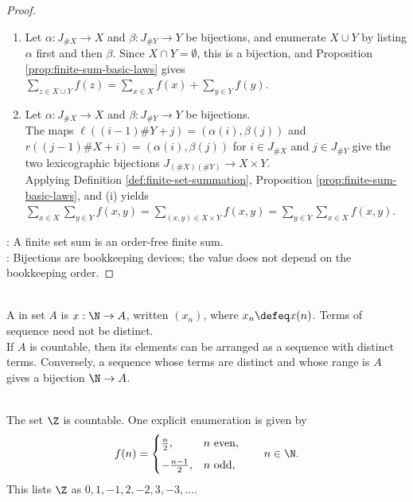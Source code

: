 \begin{proposition}
\begin{proof}
\begin{enumerate}[label=(\roman*)]
\item Let $\alpha:J_{\#X}\to X$ and $\beta:J_{\#Y}\to Y$ be bijections, and enumerate $X\cup Y$ by listing $\alpha$ first and then $\beta$. Since $X\cap Y=\emptyset$, this is a bijection, and Proposition \ref{prop:finite-sum-basic-laws} gives $\sum\limits_{z\in X\cup Y}f(z)=\sum\limits_{x\in X}f(x)+\sum\limits_{y\in Y}f(y)$.
\item Let $\alpha:J_{\#X}\to X$ and $\beta:J_{\#Y}\to Y$ be bijections.\\
The maps $\ell((i-1)\#Y+j)=(\alpha(i),\beta(j))$ and $r((j-1)\#X+i)=(\alpha(i),\beta(j))$ for $i\in J_{\#X}$ and $j\in J_{\#Y}$ give the two lexicographic bijections $J_{(\#X)(\#Y)}\to X\times Y$.\\
Applying Definition \ref{def:finite-set-summation}, Proposition \ref{prop:finite-sum-basic-laws}, and (i) yields $\sum\limits_{x\in X}\sum\limits_{y\in Y}f(x,y) =\sum\limits_{(x,y)\in X\times Y}f(x,y) =\sum\limits_{y\in Y}\sum\limits_{x\in X}f(x,y)$.
\end{enumerate}
: A finite set sum is an order-free finite sum.\\
: Bijections are bookkeeping devices; the value does not depend on the bookkeeping order.
\end{proof}
\end{proposition}

\begin{definition} \label{def:sequence-as-enumeration} \\
A  in set $A$ is $x:\N\to A$, written $(x_n)$, where $x_n\defeq x(n)$. Terms of sequence need not be distinct.\\
If $A$ is countable, then its elements can be arranged as a sequence with distinct terms. Conversely, a sequence whose terms are distinct and whose range is $A$ gives a bijection $\N\to A$.
\end{definition}

\begin{example} \label{ex:integers-are-countable} \\
The set $\Z$ is countable. One explicit enumeration is given by
\begin{align}
f(n)=
\begin{cases}
\frac{n}{2}, & n \text{ even},\\[2mm]
-\frac{n-1}{2}, & n \text{ odd},
\end{cases}
\qquad n\in\N. \nonumber
\end{align}
This lists $\Z$ as $0,1,-1,2,-2,3,-3,\ldots$.
\end{example}

